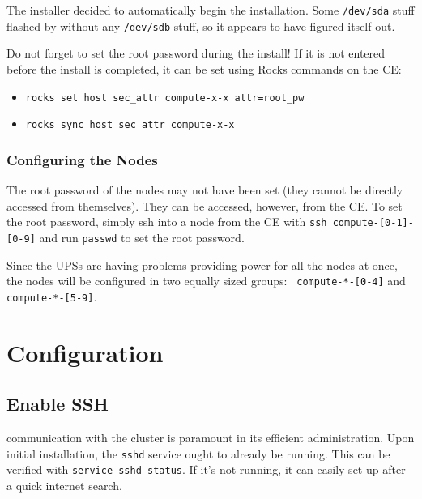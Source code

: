 \documentclass[12pt]{article}
\begin{document}
\qq The installer decided to automatically begin the installation. Some
{\tt /dev/sda} stuff flashed by without any {\tt /dev/sdb} stuff, so it appears
to have figured itself out. 

\begin{tcolorbox}[title=NOTE, colback=white, colframe=blue]
  Do not forget to set the root password during the
  install! If it is not entered before the install is completed, it can be set
  using Rocks commands on the CE: 
  \begin{itemize}
  \item {\tt rocks set host sec\_attr compute-x-x attr=root\_pw} 
  \item {\tt rocks sync host sec\_attr compute-x-x}
  \end{itemize}
\end{tcolorbox}

\subsubsection{Configuring the Nodes}

\begin{tcolorbox}[title=NOTE, colback=white, colframe=blue]
  The root password of the nodes may not have been set (they cannot be
  directly accessed from themselves). They can be accessed, however, from the
  CE. To set the root password, simply ssh into a node from the CE with {\tt ssh
    compute-[0-1]-[0-9]} and run {\tt passwd} to set the root password. 
\end{tcolorbox}

\qq Since the UPSs are having problems providing power for all the nodes at
once, the nodes will be configured in two equally sized groups: {\tt
  compute-*-[0-4]} and {\tt compute-*-[5-9]}.



\section{Configuration}

\subsection{Enable SSH}

 communication with the cluster is paramount in its efficient
administration. Upon initial installation, the {\tt sshd} service ought to
already be running. This can be verified with {\tt service sshd status}. If it's
not running, it can easily set up after a quick internet search.
\end{document}
